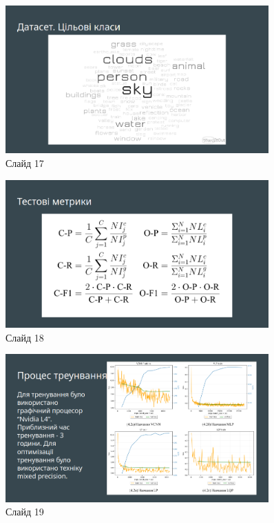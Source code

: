 \documentclass{udstu}
\begin{document}
\begin{figure}[!ht]
	\centering
	\includegraphics[width=0.9\textwidth]{PNG/present/present-17}
	\caption{Слайд 17}
\end{figure}

\begin{figure}[!ht]
	\centering
	\includegraphics[width=0.9\textwidth]{PNG/present/present-18}
	\caption{Слайд 18}
\end{figure}

\begin{figure}[!ht]
	\centering
	\includegraphics[width=0.9\textwidth]{PNG/present/present-19}
	\caption{Слайд 19}
\end{figure}
\end{document}
